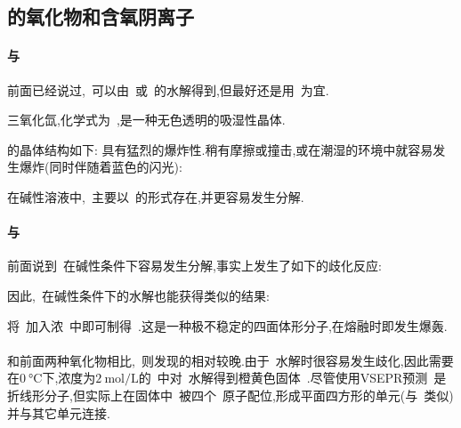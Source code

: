 \documentclass{ctexbook}
\begin{document}
\subsection{的氧化物和含氧阴离子}
\paragraph{与}
前面已经说过,~可以由~或~的水解得到,但最好还是用~为宜.
\begin{substance}[\ce{XeO3}]
    三氧化氙,化学式为~,是一种无色透明的吸湿性晶体.
\end{substance}
的晶体结构如下:
具有猛烈的爆炸性.稍有摩擦或撞击,或在潮湿的环境中就容易发生爆炸(同时伴随着蓝色的闪光):
\begin{tightcenter}
\end{tightcenter}
在碱性溶液中,~主要以~的形式存在,并更容易发生分解.
\paragraph{与~}
前面说到~在碱性条件下容易发生分解,事实上发生了如下的歧化反应:
\begin{tightcenter}
\end{tightcenter}
因此,~在碱性条件下的水解也能获得类似的结果:
\begin{tightcenter}
\end{tightcenter}
将~加入浓~中即可制得~.这是一种极不稳定的四面体形分子,在熔融时即发生爆轰.
\paragraph{}
和前面两种氧化物相比,~则发现的相对较晚\cite{Brock2011}.由于~水解时很容易发生歧化,因此需要在$\SI{0}{\celsius}$下,浓度为$\SI{2}{\mole\per\liter}$的~中对~水解得到橙黄色固体~.尽管使用VSEPR预测~是折线形分子,但实际上在固体中~被四个~原子配位,形成平面四方形的单元(与~类似)并与其它单元连接.
\end{document}

